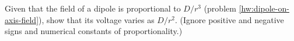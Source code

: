 Given that the field of a dipole is proportional to
$D/r^3$ (problem \ref{hw:dipole-on-axis-field}), show that its voltage varies
as $D/r^2$. (Ignore positive and negative signs and
numerical constants of proportionality.)
